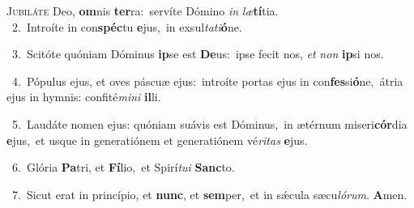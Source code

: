 \lettrine{\initial\textcolor{\initialcolor}{J}}{ubiláte} Deo, \textbf{om}\-nis \textbf{ter}\-ra:~\star servíte Dómino \textit{in} \textit{læ}\-\textbf{tí}tia.\\
{\numbfont\textcolor{\numbcolor}{~2.}}~Introíte in con\-\textbf{spéc}\-tu \textbf{e}\-jus,~\star in exsul\-\textit{ta}\-\textit{ti}\textbf{ó}ne.\par
{\numbfont\textcolor{\numbcolor}{~3.}}~Scitóte quóniam Dóminus \textbf{ip}\-se est \textbf{De}\-us:~\star ipse fecit nos, \textit{et} \textit{non} \textbf{ip}\-si nos.\par
{\numbfont\textcolor{\numbcolor}{~4.}}~Pópulus ejus, et oves páscuæ ejus:~\dagger introíte portas ejus in con\-\textbf{fes}\-si\-\textbf{ó}\-ne,~\star átria ejus in hymnis: confité\-\textit{mi}\-\textit{ni} \textbf{il}\-li.\par
{\numbfont\textcolor{\numbcolor}{~5.}}~Laudáte nomen ejus: quóniam suávis est Dóminus,~\dagger in ætérnum miseri\-\textbf{cór}\-dia \textbf{e}\-jus,~\star et usque in generatiónem et generatiónem vé\-\textit{ri}\-\textit{tas} \textbf{e}\-jus.\par
{\numbfont\textcolor{\numbcolor}{~6.}}~Glória \textbf{Pa}\-tri, et \textbf{Fí}\-lio,~\star et Spirí\-\textit{tu}\-\textit{i} \textbf{Sanc}\-to.\par
{\numbfont\textcolor{\numbcolor}{~7.}}~Sicut erat in princípio, et \textbf{nunc}\-, et \textbf{sem}\-per,~\star et in sǽcula sæcu\-\textit{ló}\-\textit{rum}. \textbf{A}\-men.\par
